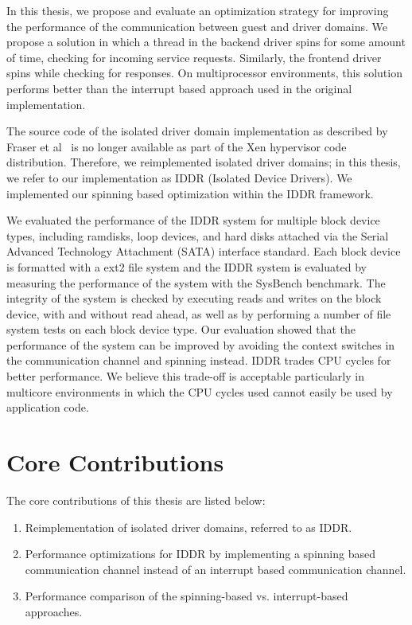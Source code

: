 In this thesis, we propose and evaluate an optimization strategy
for improving the performance of the communication between guest and
driver domains. We propose a solution in which a thread in the backend
driver spins for some amount of time, checking for incoming service
requests. Similarly, the frontend driver spins while checking for
responses.  On multiprocessor environments, this solution performs better
than the interrupt based approach used in the original implementation.

The source code of the isolated driver domain implementation as described 
by Fraser et al~\cite{driverdomain} is no longer available as part 
of the Xen hypervisor code distribution.  Therefore, we reimplemented isolated
driver domains; in this thesis, we refer to our implementation as IDDR
(Isolated Device Drivers). We implemented our spinning based optimization 
within the IDDR framework.

We evaluated the performance of the IDDR system for multiple block device
types, including ramdisks, loop devices, and hard disks attached via 
the Serial Advanced Technology Attachment (SATA) interface standard. 
Each block device
is formatted with a ext2 file system and the IDDR system is evaluated
by measuring the performance of the system with the SysBench benchmark. 
The integrity of the system is checked by executing reads and writes on 
the block device, with and without read ahead, as well as by performing 
a number of file system tests on each block device type.  
Our evaluation showed that the performance
of the system can be improved by avoiding the context switches in
the communication channel and spinning instead. 
IDDR trades CPU cycles for better performance.  We believe this 
trade-off is acceptable particularly in multicore environments in 
which the CPU cycles used cannot easily be used by application code.

\section{Core Contributions}

The core contributions of this thesis are listed below: 
\begin{enumerate}
\item Reimplementation of isolated driver domains, referred to as IDDR.
\item Performance optimizations for IDDR by implementing a spinning based 
        communication channel instead of an interrupt based communication channel. 
\item Performance comparison of the spinning-based vs. interrupt-based approaches.
\end{enumerate}

